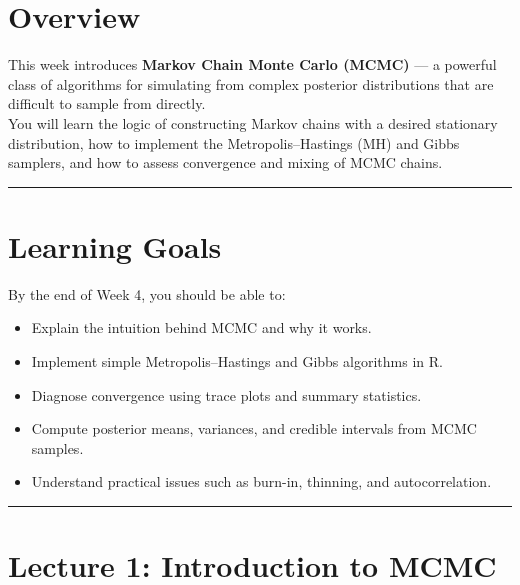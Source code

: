 \documentclass[
  letterpaper,
  DIV=11,
  numbers=noendperiod]{scrreprt}
\providecommand{\tightlist}{%
  \setlength{\itemsep}{0pt}\setlength{\parskip}{0pt}}
\begin{document}
\section{Overview}\label{overview-2}

This week introduces \textbf{Markov Chain Monte Carlo (MCMC)} --- a
powerful class of algorithms for simulating from complex posterior
distributions that are difficult to sample from directly.\\
You will learn the logic of constructing Markov chains with a desired
stationary distribution, how to implement the Metropolis--Hastings (MH)
and Gibbs samplers, and how to assess convergence and mixing of MCMC
chains.

\begin{center}\rule{0.5\linewidth}{0.5pt}\end{center}

\section{Learning Goals}\label{learning-goals-2}

By the end of Week 4, you should be able to:

\begin{itemize}
\tightlist
\item
  Explain the intuition behind MCMC and why it works.\\
\item
  Implement simple Metropolis--Hastings and Gibbs algorithms in R.\\
\item
  Diagnose convergence using trace plots and summary statistics.\\
\item
  Compute posterior means, variances, and credible intervals from MCMC
  samples.\\
\item
  Understand practical issues such as burn-in, thinning, and
  autocorrelation.
\end{itemize}

\begin{center}\rule{0.5\linewidth}{0.5pt}\end{center}

\section{Lecture 1: Introduction to
MCMC}\label{lecture-1-introduction-to-mcmc}
\end{document}
